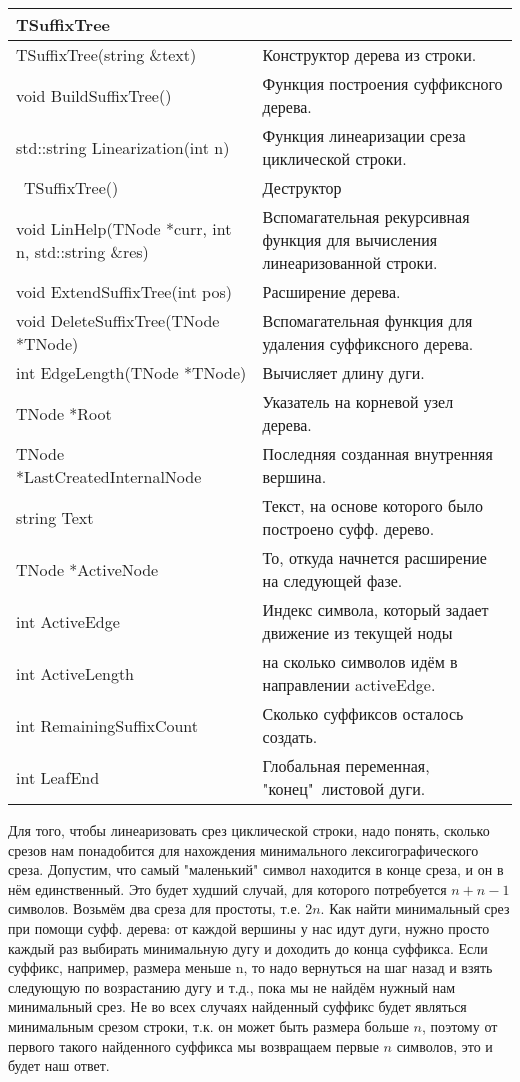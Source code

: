\begin{longtable}{|p{7.5cm}|p{7.5cm}|}
    \hline
    \rowcolor{lightgray}
    \multicolumn{2}{|c|} {TSuffixTree}\\
    \hline
    TSuffixTree(string \&text)&Конструктор дерева из строки.\\
    \hline
    \hline
    void BuildSuffixTree()&Функция построения суффиксного дерева.\\
    \hline
    std::string Linearization(int n)&Функция линеаризации среза циклической строки.\\
    \hline
    ~TSuffixTree()&Деструктор\\
    \hline
    void LinHelp(TNode *curr, int n, std::string \&res)&Вспомагательная рекурсивная функция для вычисления линеаризованной строки.\\
    \hline
    \hline
    void ExtendSuffixTree(int pos)&Расширение дерева.\\
    \hline
    \hline
    void DeleteSuffixTree(TNode *TNode)&Вспомагательная функция для удаления суффиксного дерева.\\
    \hline
    \hline
    int EdgeLength(TNode *TNode)&Вычисляет длину дуги.\\
    \hline
    \hline
    TNode *Root&Указатель на корневой узел дерева.\\
    \hline
    \hline
    TNode *LastCreatedInternalNode&Последняя созданная внутренняя вершина.\\
    \hline
    \hline
    string Text&Текст, на основе которого было построено суфф. дерево.\\
    \hline
    \hline
    TNode *ActiveNode&То, откуда начнется расширение на следующей фазе.\\
    \hline
    \hline
    int ActiveEdge&Индекс символа, который задает движение из текущей ноды\\
    \hline
    \hline
    int ActiveLength&на сколько символов идём в направлении activeEdge.\\
    \hline
    \hline
    int RemainingSuffixCount&Сколько суффиксов осталось создать.\\
    \hline
    \hline
    int LeafEnd&Глобальная переменная, "конец"\ листовой дуги.\\
    \hline
\end{longtable}
Для того, чтобы линеаризовать срез циклической строки, надо понять, сколько срезов нам понадобится для нахождения минимального
лексигографического среза. Допустим, что самый "маленький" символ находится в конце среза, и он в нём единственный. Это будет худший случай,
для которого потребуется $n+n-1$ символов. Возьмём два среза для простоты, т.е. $2n$. Как найти минимальный срез при помощи суфф. дерева: от каждой вершины
у нас идут дуги, нужно просто каждый раз выбирать минимальную дугу и доходить до конца суффикса. Если суффикс, например, размера меньше n, то надо
вернуться на шаг назад и взять следующую по возрастанию дугу и т.д., пока мы не найдём нужный нам минимальный срез. Не во всех случаях найденный суффикс
будет являться минимальным срезом строки, т.к. он может быть размера больше $n$, поэтому от первого такого найденного суффикса мы возвращаем первые $n$ символов,
это и будет наш ответ.

